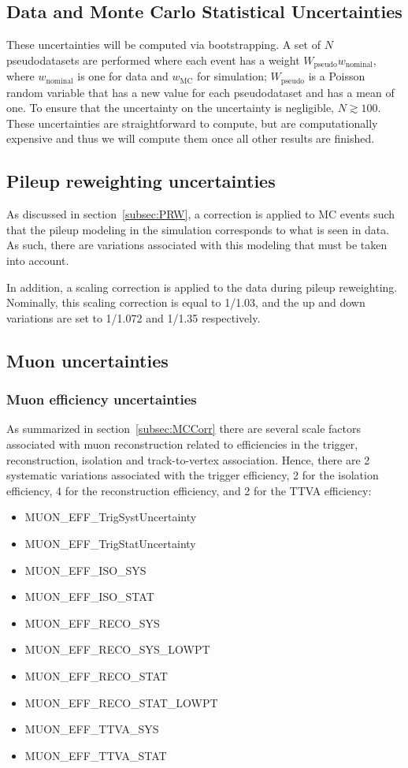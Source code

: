 \subsection{Data and Monte Carlo Statistical Uncertainties}

These uncertainties will be computed via bootstrapping.  A set of $N$ pseudodatasets are performed where each event has a weight $W_\text{pseudo}w_\text{nominal}$, where $w_\text{nominal}$ is one for data and $w_\text{MC}$ for simulation; $W_\text{pseudo}$ is a Poisson random variable that has a new value for each pseudodataset and has a mean of one.  To ensure that the uncertainty on the uncertainty is negligible, $N\gtrsim 100$.  These uncertainties are straightforward to compute, but are computationally expensive and thus we will compute them once all other results are finished.

\subsection{Pileup reweighting uncertainties}
As discussed in section~\ref{subsec:PRW}, a correction is applied to MC events such that the pileup modeling in the simulation corresponds to what is seen in data. As such, there are variations associated with this modeling
that must be taken into account.

In addition, a scaling correction is applied to the data during pileup reweighting. Nominally, this scaling correction is equal to 1/1.03, and the up and down variations are set to 1/1.072 and 1/1.35 respectively.

\subsection{Muon uncertainties}

\subsubsection{Muon efficiency uncertainties}
As summarized in section~\ref{subsec:MCCorr} there are several scale factors associated with muon reconstruction related to efficiencies in the trigger, reconstruction, isolation and track-to-vertex association.
Hence, there are 2 systematic variations associated with the trigger efficiency, 2 for the isolation efficiency, 4 for the reconstruction efficiency, and 2 for the TTVA efficiency:
\begin{itemize}
  \item MUON\_EFF\_TrigSystUncertainty
  \item MUON\_EFF\_TrigStatUncertainty
  \item MUON\_EFF\_ISO\_SYS
  \item MUON\_EFF\_ISO\_STAT
  \item MUON\_EFF\_RECO\_SYS
  \item MUON\_EFF\_RECO\_SYS\_LOWPT
  \item MUON\_EFF\_RECO\_STAT
  \item MUON\_EFF\_RECO\_STAT\_LOWPT
  \item MUON\_EFF\_TTVA\_SYS
  \item MUON\_EFF\_TTVA\_STAT
\end{itemize}

